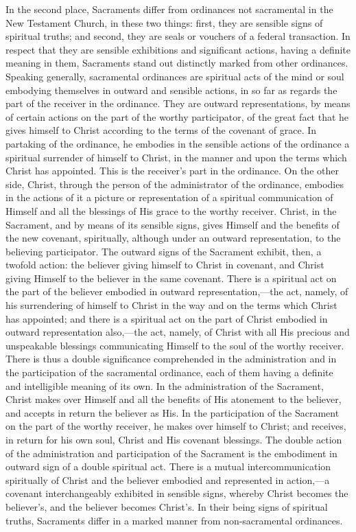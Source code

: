 \documentclass[
  english,
]{book}
\begin{document}
In the second place, Sacraments differ from ordinances not sacramental in the New Testament Church, in these two things: first, they are sensible signs of spiritual truths; and second, they are seals or vouchers of a federal transaction. In respect that they are sensible exhibitions and significant actions, having a definite meaning in them, Sacraments stand out distinctly marked from other ordinances. Speaking generally, sacramental ordinances are spiritual acts of the mind or soul embodying themselves in outward and sensible actions, in so far as regards the part of the receiver in the ordinance. They are outward representations, by means of certain actions on the part of the worthy participator, of the great fact that he gives himself to Christ according to the terms of the covenant of grace. In partaking of the ordinance, he embodies in the sensible actions of the ordinance a spiritual surrender of himself to Christ, in the manner and upon the terms which Christ has appointed. This is the receiver's part in the ordinance. On the other side, Christ, through the person of the administrator of the ordinance, embodies in the actions of it a picture or representation of a spiritual communication of Himself and all the blessings of His grace to the worthy receiver. Christ, in the Sacrament, and by means of its sensible signs, gives Himself and the benefits of the new covenant, spiritually, although under an outward representation, to the believing participator. The outward signs of the Sacrament exhibit, then, a twofold action: the believer giving himself to Christ in covenant, and Christ giving Himself to the believer in the same covenant. There is a spiritual act on the part of the believer embodied in outward representation,---the act, namely, of his surrendering of himself to Christ in the way and on the terms which Christ has appointed; and there is a spiritual act on the part of Christ embodied in outward representation also,---the act, namely, of Christ with all His precious and unspeakable blessings communicating Himself to the soul of the worthy receiver. There is thus a double significance comprehended in the administration and in the participation of the sacramental ordinance, each of them having a definite and intelligible meaning of its own. In the administration of the Sacrament, Christ makes over Himself and all the benefits of His atonement to the believer, and accepts in return the believer as His. In the participation of the Sacrament on the part of the worthy receiver, he makes over himself to Christ; and receives, in return for his own soul, Christ and His covenant blessings. The double action of the administration and participation of the Sacrament is the embodiment in outward sign of a double spiritual act. There is a mutual intercommunication spiritually of Christ and the believer embodied and represented in action,---a covenant interchangeably exhibited in sensible signs, whereby Christ becomes the believer's, and the believer becomes Christ's. In their being signs of spiritual truths, Sacraments differ in a marked manner from non-sacramental ordinances.
\end{document}
